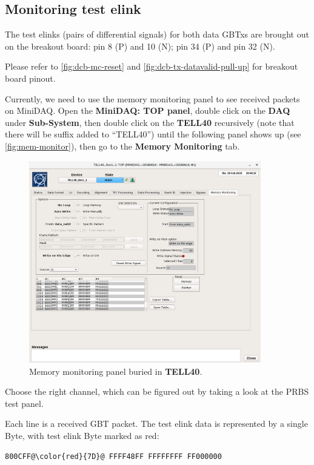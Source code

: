 \subsection{Monitoring test elink}
The test elinks (pairs of differential signals) for both data GBTxs are brought
out on the breakout board: pin 8 (P) and 10 (N); pin 34 (P) and pin 32 (N).

Please refer to
\autoref{fig:dcb-mc-reset} and \autoref{fig:dcb-tx-datavalid-pull-up} for
breakout board pinout.

Currently, we need to use the memory monitoring panel to see received packets on
MiniDAQ. Open the \textbf{MiniDAQ: TOP panel}, double click on the
\textbf{DAQ} under \textbf{Sub-System}, then double click on the \textbf{TELL40}
recursively (note that there will be suffix added to ``TELL40'') until the
following panel shows up (see \autoref{fig:mem-monitor}), then go to the
\textbf{Memory Monitoring} tab.

\begin{figure}[ht]
    \centering
    \includegraphics[width=0.9\textwidth]{res/memory_monitoring_panel.png}
    \caption{Memory monitoring panel buried in \textbf{TELL40}.}
    \label{fig:mem-monitor}
\end{figure}

Choose the right channel, which can be figured out by taking a look at the PRBS
test panel.

Each line is a received GBT packet. The test elink data is represented by a
single Byte, with test elink Byte marked as red:

\begin{lstlisting}[escapechar=@]
800CFF@\color{red}{7D}@ FFFF48FF FFFFFFFF FF000000
\end{lstlisting}
